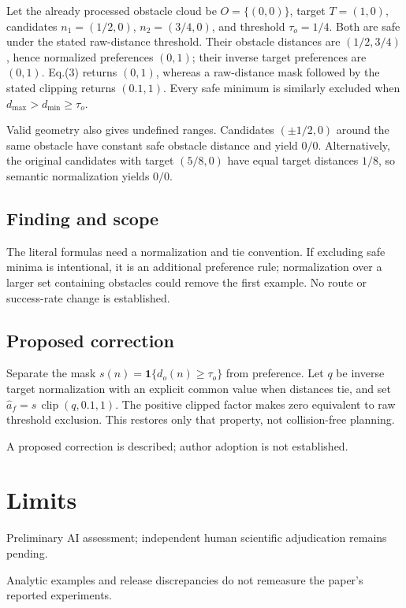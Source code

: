 \documentclass[11pt]{article}
\begin{document}
Let the already processed obstacle cloud be \(O=\{(0,0)\}\), target \(T=(1,0)\), candidates \(n_1=(1/2,0)\), \(n_2=(3/4,0)\), and threshold \(\tau_o=1/4\). Both are safe under the stated raw-distance threshold. Their obstacle distances are \((1/2,3/4)\), hence normalized preferences \((0,1)\); their inverse target preferences are \((0,1)\). Eq.(3) returns \((0,1)\), whereas a raw-distance mask followed by the stated clipping returns \((0.1,1)\). Every safe minimum is similarly excluded when \(d_{\max}>d_{\min}\ge\tau_o\).

Valid geometry also gives undefined ranges. Candidates \((\pm1/2,0)\) around the same obstacle have constant safe obstacle distance and yield \(0/0\). Alternatively, the original candidates with target \((5/8,0)\) have equal target distances \(1/8\), so semantic normalization yields \(0/0\).

\subsection*{Finding and scope}

The literal formulas need a normalization and tie convention. If excluding safe minima is intentional, it is an additional preference rule; normalization over a larger set containing obstacles could remove the first example. No route or success-rate change is established.

\subsection*{Proposed correction}

Separate the mask \(s(n)=\mathbf1\{d_o(n)\ge\tau_o\}\) from preference. Let \(q\) be inverse target normalization with an explicit common value when distances tie, and set \(\widehat a_f=s\,\operatorname{clip}(q,0.1,1)\). The positive clipped factor makes zero equivalent to raw threshold exclusion. This restores only that property, not collision-free planning.

A proposed correction is described; author adoption is not established.

\section*{Limits}

Preliminary AI assessment; independent human scientific adjudication remains pending.\par

Analytic examples and release discrepancies do not remeasure the paper’s reported experiments.\par
\end{document}
